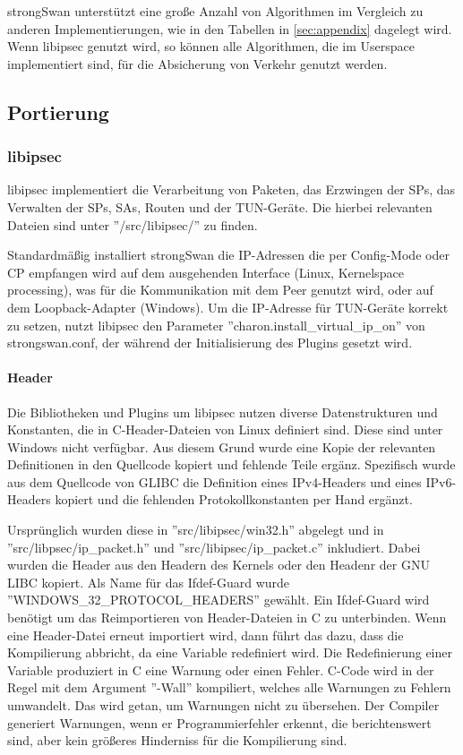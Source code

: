 strongSwan unterstützt eine große Anzahl von Algorithmen im Vergleich zu anderen Implementierungen,
wie in den Tabellen in \autoref{sec:appendix} dagelegt wird. Wenn libipsec genutzt wird,
so können alle Algorithmen, die im Userspace implementiert sind, für die Absicherung
von Verkehr genutzt werden.

\subsection{Portierung}
\subsubsection{libipsec}
libipsec implementiert die Verarbeitung von Paketen, das Erzwingen der \acp{SP},
das Verwalten der \acp{SP}, \acp{SA}, Routen und der TUN-Geräte.
Die hierbei relevanten Dateien sind unter ''/src/libipsec/'' zu finden.

Standardmäßig installiert strongSwan die IP-Adressen die per Config-Mode
oder \ac{CP} empfangen wird auf dem ausgehenden Interface (Linux, Kernelspace processing),
was für die Kommunikation mit dem Peer genutzt wird,
oder auf dem Loopback-Adapter (Windows).
Um die IP-Adresse für TUN-Geräte korrekt zu setzen, nutzt libipsec den Parameter
''charon.install\_virtual\_ip\_on'' von strongswan.conf, der während der Initialisierung
des Plugins gesetzt wird.
\paragraph{Header}
Die Bibliotheken und Plugins um libipsec nutzen diverse Datenstrukturen und Konstanten,
die in C-Header-Dateien von Linux definiert sind. Diese sind unter Windows nicht verfügbar.
Aus diesem Grund wurde eine Kopie der relevanten Definitionen in den Quellcode kopiert
und fehlende Teile ergänz.
Spezifisch wurde aus dem Quellcode von GLIBC die Definition eines \ac{IP}v4-Headers
und eines \ac{IP}v6-Headers kopiert und die fehlenden Protokollkonstanten per Hand ergänzt.

Ursprünglich wurden diese in ''src/libipsec/win32.h'' abgelegt und in ''src/libpsec/ip\_packet.h'' und ''src/libipsec/ip\_packet.c''
inkludiert. Dabei wurden die Header aus den Headern des Kernels oder den Headenr der GNU LIBC kopiert.
Als Name für das Ifdef-Guard wurde ''WINDOWS\_32\_PROTOCOL\_HEADERS'' gewählt. Ein Ifdef-Guard wird benötigt um das Reimportieren
von Header-Dateien in C zu unterbinden. Wenn eine Header-Datei erneut importiert wird,
dann führt das dazu, dass die Kompilierung abbricht, da eine Variable redefiniert wird.
Die Redefinierung einer Variable produziert in C eine Warnung oder einen Fehler.
C-Code wird in der Regel mit dem Argument ''-Wall'' kompiliert, welches
alle Warnungen zu Fehlern umwandelt. Das wird getan, um Warnungen nicht zu übersehen.
Der Compiler generiert Warnungen, wenn er Programmierfehler erkennt,
die berichtenswert sind, aber kein größeres Hinderniss für die Kompilierung sind.

